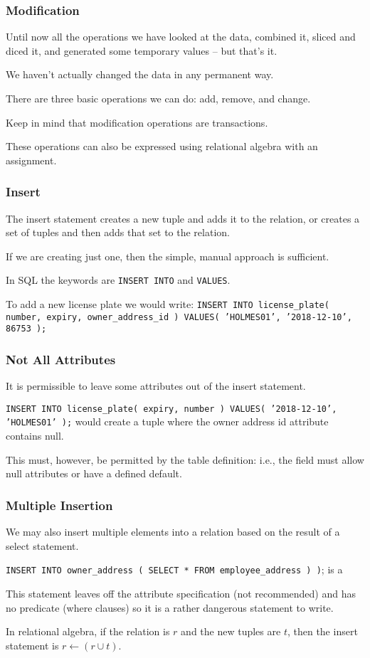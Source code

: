 \begin{frame}
\frametitle{Modification}

Until now all the operations we have looked at the data, combined it, sliced and diced it, and generated some temporary values -- but that's it. 

We haven't actually changed the data in any permanent way. 

There are three basic operations we can do: add, remove, and change.

Keep in mind that modification operations are transactions. 

These operations can also be expressed using relational algebra with an assignment. 

\end{frame}



\begin{frame}
\frametitle{Insert}

The insert statement creates a new tuple and adds it to the relation, or creates a set of tuples and then adds that set to the relation.

If we are creating just one, then the simple, manual approach is sufficient. 

In SQL the keywords are \texttt{INSERT INTO} and \texttt{VALUES}. 

To add a new license plate we would write: \texttt{INSERT INTO license\_plate( number, expiry, owner\_address\_id ) VALUES( 'HOLMES01', '2018-12-10', 86753 );} 

\end{frame}



\begin{frame}
\frametitle{Not All Attributes}

It is permissible to leave some attributes out of the insert statement. 

\texttt{INSERT INTO license\_plate( expiry, number ) VALUES( '2018-12-10', 'HOLMES01' );} would create a tuple where the owner address id attribute contains null. 

This must, however, be permitted by the table definition: i.e., the field must allow null attributes or have a defined default.


\end{frame}



\begin{frame}
\frametitle{Multiple Insertion}


We may also insert multiple elements into a relation based on the result of a select statement. 

\texttt{INSERT INTO owner\_address ( SELECT * FROM employee\_address ) )}; is a 

This statement leaves off the attribute specification (not recommended) and has no predicate (where clauses) so it is a rather dangerous statement to write.

In relational algebra, if the relation is $r$ and the new tuples are $t$, then the insert statement is $r \leftarrow (r \cup t)$.


\end{frame}



